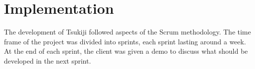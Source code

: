 \section{Implementation}
\label{implementation}
The development of Tsukiji followed aspects of the Scrum methodology. The time frame of the project was divided into sprints, each sprint lasting around a week. 
At the end of each sprint, the client was given a demo to discuss what should be developed in the next sprint.




\newpage

